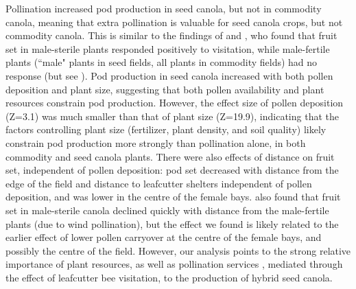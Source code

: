 \documentclass[12pt, draft]{article} %
\begin{document}
Pollination increased pod production in seed canola, but not in commodity canola, meaning that extra pollination is valuable for seed canola crops, but not commodity canola. 
This is similar to the findings of \citet{mesquida1981} and \citet{steffan2003}, who found that fruit set in male-sterile plants responded positively to visitation, while male-fertile plants (``male" plants in seed fields, all plants in commodity fields) had no response (but see \citealp{adegas1992}).
Pod production in seed canola increased with both pollen deposition and plant size, suggesting that both pollen availability and plant resources constrain pod production. %
However, the effect size of pollen deposition (Z=3.1) was much smaller than that of plant size (Z=19.9), indicating that the factors controlling plant size (fertilizer, plant density, and soil quality) likely constrain pod production more strongly than pollination alone, in both commodity and seed canola plants. %
There were also effects of distance on fruit set, independent of pollen deposition: pod set decreased with distance from the edge of the field and distance to leafcutter shelters independent of pollen deposition, and was lower in the centre of the female bays.
\citet{mesquida1978} also found that fruit set in male-sterile canola declined quickly with distance from the male-fertile plants (due to wind pollination), but the effect we found is likely related to the earlier effect of lower pollen carryover at the centre of the female bays, and possibly the centre of the field.
However, our analysis points to the strong relative importance of plant resources, as well as pollination services \citep{marini2015}, mediated through the effect of leafcutter bee visitation, to the production of hybrid seed canola. 
\end{document}
